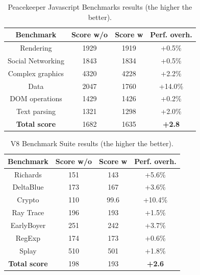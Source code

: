 \begin{table}[htdp] 
\begin{center}
\begin{tabular}{|c|c|c|c|} 
\hline
\bf{Benchmark} & \bf{Score w/o} & \bf{Score w} & \bf{Perf. overh.} \\
\hline
Rendering     	       &    1929 	& 	1919   	& 	+0.5\%\\
Social Networking 	&  	1843  	&     1834  	& 	+0.5\%\\
Complex graphics  	&  	4320 	&     4228  	& 	+2.2\%\\ 
Data                           &	2047	&     1760 	& 	+14.0\%\\
DOM operations 	       &    1429 	&	1426	& 	+0.2\%\\
Text parsing     	       &  	1321      &     1298 	& 	+2.0\%\\ 
\hline
\bf{Total score}        	&  1682 	   &      1635     & \bf{+2.8}\\ 
\hline
\end{tabular}
\end{center}
\caption{{ Peacekeeper Javascript Benchmarks results (the higher the better).}}
\label{peacekeeper}
\end{table} 

\begin{table}[htdp]   
\begin{center}
\begin{tabular}{|c|c|c|c|} 
\hline
\bf{Benchmark} & \bf{Score w/o} & \bf{Score w} & \bf{Perf. overh.} \\
\hline
Richards      &      151       &    143 	  & 	+5.6\%\\
DeltaBlue 	&      173  	&  	167  	& 	+3.6\%\\
Crypto  		&      110  	&  	99.6 	& 	+10.4\%\\ 
Ray Trace    &      196      &	193		& 	+1.5\%\\
EarlyBoyer	&      251 	&	242		& 	+3.7\%\\
RegExp     	&      174 	&  	173		& 	+0.6\%\\ 
Splay     	&      510 	&  	501		& 	+1.8\%\\ 
\hline
\bf{Total score}        &      198     &  193   & \bf{+2.6}\\ 
\hline
\end{tabular}
\end{center}
\caption{{ V8 Benchmark Suite results (the higher the better).}}
\label{v8}
\end{table} 

